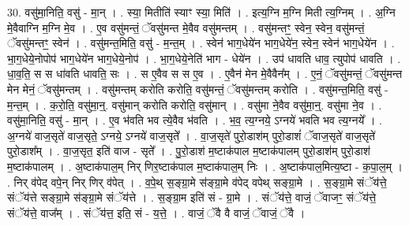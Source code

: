 \documentclass[17pt]{extarticle}
\begin{document}
30. वसु॑मा॒निति॒ वसु॑ - मा॒न् । . स्या॒ मितीति॑ स्याꣳ स्या॒ मिति॑ । . इत्य॒ग्नि म॒ग्नि मिती त्य॒ग्निम् । . अ॒ग्नि मे॒वैवाग्नि म॒ग्नि मे॒व । . ए॒व वसु॑मन्तं॒ ॅवसु॑मन्त मे॒वैव वसु॑मन्तम् । . वसु॑मन्तꣳ॒॒ स्वेन॒ स्वेन॒ वसु॑मन्तं॒ ॅवसु॑मन्तꣳ॒॒ स्वेन॑ । . वसु॑मन्त॒मिति॒ वसु॑ - म॒न्त॒म् । . स्वेन॑ भाग॒धेये॑न भाग॒धेये॑न॒ स्वेन॒ स्वेन॑ भाग॒धेये॑न । . भा॒ग॒धेये॒नोपोप॑ भाग॒धेये॑न भाग॒धेये॒नोप॑ । . भा॒ग॒धेये॒नेति॑ भाग - धेये॑न । . उप॑ धावति धाव॒ त्युपोप॑ धावति । . धा॒व॒ति॒ स स धा॑वति धावति॒ सः । . स ए॒वैव स स ए॒व । . ए॒वैन॑ मेन मे॒वैवैन᳚म् । . ए॒नं॒ ॅवसु॑मन्तं॒ ॅवसु॑मन्त मेन मेनं॒ ॅवसु॑मन्तम् । . वसु॑मन्तम् करोति करोति॒ वसु॑मन्तं॒ ॅवसु॑मन्तम् करोति । . वसु॑मन्त॒मिति॒ वसु॑ - म॒न्त॒म् । . क॒रो॒ति॒ वसु॑मा॒न्॒. वसु॑मान् करोति करोति॒ वसु॑मान् । . वसु॑मा ने॒वैव वसु॑मा॒न्॒. वसु॑मा ने॒व । . वसु॑मा॒निति॒॒ वसु॑ - मा॒न् । . ए॒व भ॑वति भव त्ये॒वैव भ॑वति । . भ॒व॒ त्य॒ग्नये॒ ऽग्नये॑ भवति भव त्य॒ग्नये᳚ । . अ॒ग्नये॑ वाज॒सृते॑ वाज॒सृते॒ ऽग्नये॒ ऽग्नये॑ वाज॒सृते᳚ । . वा॒ज॒सृते॑ पुरो॒डाश॑म् पुरो॒डाशं॑ ॅवाज॒सृते॑ वाज॒सृते॑ पुरो॒डाश᳚म् । . वा॒ज॒सृत॒ इति॑ वाज - सृते᳚ । . पु॒रो॒डाश॑ म॒ष्टाक॑पाल म॒ष्टाक॑पालम् पुरो॒डाश॑म् पुरो॒डाश॑ म॒ष्टाक॑पालम् । . अ॒ष्टाक॑पाल॒म् निर् णिर॒ष्टाक॑पाल म॒ष्टाक॑पाल॒म् निः । . अ॒ष्टाक॑पाल॒मित्य॒ष्टा - क॒पा॒ल॒म् । . निर् व॑पेद् वपे॒न् निर् णिर् व॑पेत् । . व॒पे॒थ् स॒ङ्ग्रा॒मे स॑ङ्ग्रा॒मे व॑पेद् वपेथ् सङ्ग्रा॒मे । . स॒ङ्ग्रा॒मे संॅय॑त्ते॒ संॅय॑त्ते सङ्ग्रा॒मे स॑ङ्ग्रा॒मे संॅय॑त्ते । . स॒ङ्ग्रा॒म इति॑ सं - ग्रा॒मे । . संॅय॑त्ते॒ वाजं॒ ॅवाजꣳ॒॒ संॅय॑त्ते॒ संॅय॑त्ते॒ वाज᳚म् । . संॅय॑त्त॒ इति॒ सं - य॒त्ते॒ । . वाजं॒ ॅवै वै वाजं॒ ॅवाजं॒ ॅवै । \newline
\end{document}
